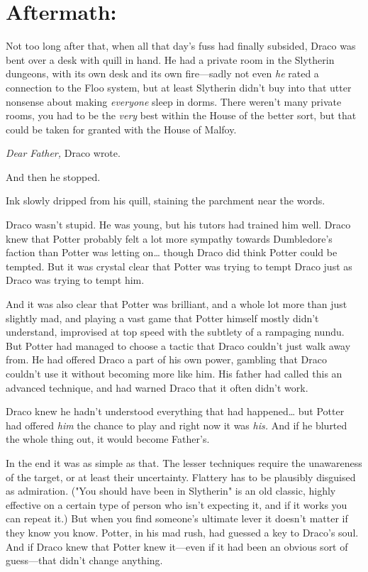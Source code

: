 \section{Aftermath:}

Not too long after that, when all that day's fuss had finally subsided, Draco
was bent over a desk with quill in hand. He had a private room in the Slytherin
dungeons, with its own desk and its own fire---sadly not even \emph{he} rated a
connection to the Floo system, but at least Slytherin didn't buy into that
utter nonsense about making \emph{everyone} sleep in dorms. There weren't many
private rooms, you had to be the \emph{very} best within the House of the
better sort, but that could be taken for granted with the House of Malfoy.

\emph{Dear Father,} Draco wrote.

And then he stopped.

Ink slowly dripped from his quill, staining the parchment near the words.

Draco wasn't stupid. He was young, but his tutors had trained him well. Draco
knew that Potter probably felt a lot more sympathy towards Dumbledore's faction
than Potter was letting on{\ldots} though Draco did think Potter could be
tempted. But it was crystal clear that Potter was trying to tempt Draco just as
Draco was trying to tempt him.

And it was also clear that Potter was brilliant, and a whole lot more than just
slightly mad, and playing a vast game that Potter himself mostly didn't
understand, improvised at top speed with the subtlety of a rampaging nundu. But
Potter had managed to choose a tactic that Draco couldn't just walk away from.
He had offered Draco a part of his own power, gambling that Draco couldn't use
it without becoming more like him. His father had called this an advanced
technique, and had warned Draco that it often didn't work.

Draco knew he hadn't understood everything that had happened{\ldots} but Potter
had offered \emph{him} the chance to play and right now it was \emph{his.} And
if he blurted the whole thing out, it would become Father's.

In the end it was as simple as that. The lesser techniques require the
unawareness of the target, or at least their uncertainty. Flattery has to be
plausibly disguised as admiration. ("You should have been in Slytherin" is an
old classic, highly effective on a certain type of person who isn't expecting
it, and if it works you can repeat it.) But when you find someone's ultimate
lever it doesn't matter if they know you know. Potter, in his mad rush, had
guessed a key to Draco's soul. And if Draco knew that Potter knew it---even if
it had been an obvious sort of guess---that didn't change anything.

